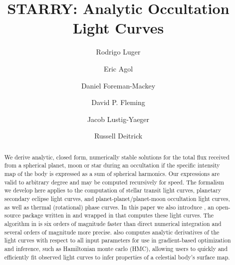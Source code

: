 \documentclass[modern]{aastex61}
\begin{document}
\setlength{\abovedisplayskip}{1.5em}
\setlength{\belowdisplayskip}{1.5em}

\title{%
    \textbf{STARRY}: Analytic Occultation Light Curves
}

\author[0000-0002-0296-3826]{Rodrigo Luger}
%
\author[0000-0002-0802-9145]{Eric Agol}
%
\author{Daniel Foreman-Mackey}
%
\author{David P. Fleming}
%
\author{Jacob Lustig-Yaeger}
%
\author{Russell Deitrick}


\begin{abstract}
We derive analytic, closed form, numerically stable solutions for the total flux
received from a spherical planet, moon or star during an occultation
if the specific intensity map of the body is expressed as a
sum of spherical harmonics. Our expressions are valid to arbitrary degree
and may be computed recursively for speed. The formalism we develop
here applies to the computation of stellar transit light curves,
planetary secondary eclipse light curves, and planet-planet/planet-moon
occultation light curves, as well as thermal (rotational) phase curves.
In this paper we also introduce \starry, an open-source package written in \cpp
and wrapped in \Python that computes these light curves.
The algorithm in \starry is six orders of magnitude faster than direct
numerical integration and several orders of magnitude more precise.
\starry also computes analytic derivatives of the light curves with respect to all input
parameters for use in gradient-based optimization and inference, such as
Hamiltonian monte carlo (HMC), allowing users to quickly and efficiently
fit observed light curves to infer properties of a celestial body's
surface map.
\end{abstract}
\end{document}

